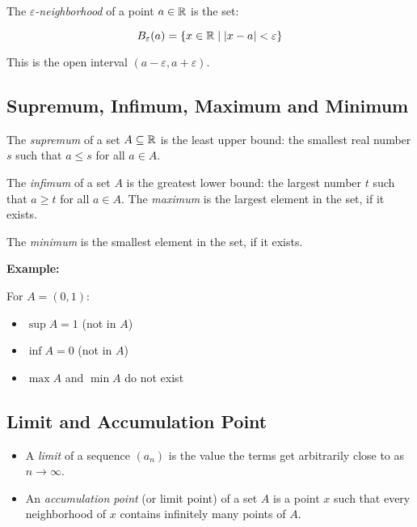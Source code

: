 The \emph{\(\varepsilon\)-neighborhood} of a point \(a \in \mathbb{R}\) is the set:

\[
    B_\varepsilon(a) = \{x \in \mathbb{R} \mid |x - a| < \varepsilon\}
\]

This is the open interval \((a - \varepsilon, a + \varepsilon)\).

\subsection{Supremum, Infimum, Maximum and Minimum}

The \emph{supremum} of a set \(A \subseteq \mathbb{R}\) is the 
least upper bound: the smallest real number \(s\) such that \(a \le s\) for all \(a \in A\).

The \emph{infimum} of a set \(A\) is the greatest lower bound: 
the largest number \(t\) such that \(a \ge t\) for all \(a \in A\). The \emph{maximum} is the largest 
element in the set, if it exists.

The \emph{minimum} is the smallest element in the set, if it exists.

\textbf{Example:}

For \(A = (0,1)\):

\begin{itemize}

    \item \(\sup A = 1\) (not in \(A\))

    \item \(\inf A = 0\) (not in \(A\))

    \item \(\max A\) and \(\min A\) do not exist

\end{itemize}

\subsection{Limit and Accumulation Point}

\begin{itemize}

    \item A \emph{limit} of a sequence \((a_n)\) is the value the terms get arbitrarily close to as 
    \(n \to \infty\).

    \item An \emph{accumulation point} (or limit point) of a set \(A\) is a point \(x\) such that every 
    neighborhood of \(x\) contains infinitely many points of \(A\).

\end{itemize}

